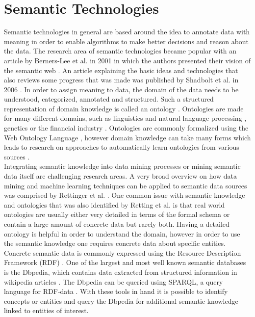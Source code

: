 \section{Semantic Technologies}
\label{subsec_semanticWeb}
Semantic technologies in general are based around the idea to annotate data with meaning in order to enable algorithms to make better decisions and reason about the data. The research area of semantic technologies became popular with an article by Berners-Lee et al. in 2001 in which the authors presented their vision of the semantic web \cite{berners2001semantic}. An article explaining the basic ideas and technologies that also reviews some progress that was made was published by Shadbolt et al. in 2006 \cite{shadbolt2006semantic}. In order to assign meaning to data, the domain of the data needs to be understood, categorized, annotated and structured. Such a structured representation of domain knowledge is called an ontology \cite{noy2004semantic}. Ontologies are made for many different domains, such as linguistics and natural language processing \cite{dahlgren1995linguistic}, genetics \cite{botstein2000gene} or the financial industry \cite{bennett2014adopting}. Ontologies are commonly formalized using the Web Ontology Language \cite{bechhofer2009owl}, however domain knowledge can take many forms which leads to research on approaches to automatically learn ontologies from various sources \cite{maedche2012ontology} \cite{ijntema2012lexico}. \\
Integrating semantic knowledge into data mining processes \cite{mabroukeh2009using} or mining semantic data itself \cite{stumme2006semantic} are challenging research areas. A very broad overview on how data mining and machine learning techniques can be applied to semantic data sources was comprised by Rettinger et al. \cite{rettinger2012mining}. One common issue with semantic knowledge and ontologies that was also identified by Retting et al. is that real world ontologies are usually either very detailed in terms of the formal schema or contain a large amount of concrete data but rarely both. Having a detailed ontology is helpful in order to understand the domain, however in order to use the semantic knowledge one requires concrete data about specific entities. Concrete semantic data is commonly expressed using the Resource Description Framework (RDF) \cite{miller1998introduction}. One of the largest and most well known semantic databases is the Dbpedia, which contains data extracted from structured information in wikipedia articles \cite{auer2007dbpedia}. The Dbpedia can be queried using SPARQL, a query language for RDF-data \cite{perez2006semantics}. With these tools in hand it is possible to identify concepts or entities and query the Dbpedia for additional semantic knowledge linked to entities of interest.


